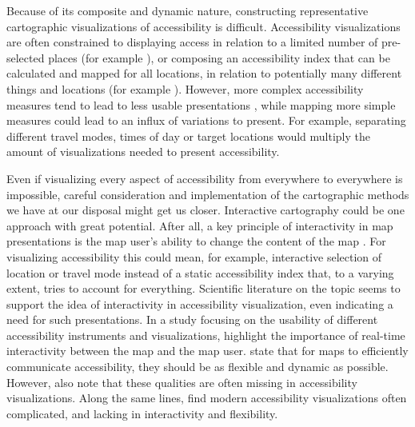 Because of its composite and dynamic nature,
constructing representative cartographic visualizations of accessibility is difficult.
Accessibility visualizations are often constrained
to displaying access in relation to
a limited number of pre-selected places (for example \textcite{wei2018}),
or composing an accessibility index
that can be calculated and mapped for all locations,
in relation to potentially many different things and locations
(for example \textcite{kim2019}).
However, more complex accessibility measures tend to lead to
less usable presentations \parencite{te2014},
while mapping more simple measures could lead to an influx of variations to present.
For example, separating different travel modes, times of day or target locations
would multiply the amount of visualizations needed to present accessibility.


Even if visualizing every aspect of accessibility
from everywhere to everywhere is impossible,
careful consideration and implementation
of the cartographic methods we have at our disposal might get us closer.
Interactive cartography could be one approach with great potential.
After all, a key principle of interactivity in map presentations is
the map user's ability to change the content of the map \parencite{rot2013b}.
For visualizing accessibility this could mean, for example,
interactive selection of location or travel mode instead of
a static accessibility index that, to a varying extent,
tries to account for everything.
Scientific literature on the topic seems to support the idea of
interactivity in accessibility visualization,
even indicating a need for such presentations.
In a study focusing on the usability of
different accessibility instruments and visualizations,  %
\textcite{te2014} highlight the importance of
real-time interactivity between the map and the map user.
\textcite{but2018} state that for maps to efficiently communicate accessibility,
they should be as flexible and dynamic as possible.
However, \textcite{but2018} also note that
these qualities are often missing in accessibility visualizations.
Along the same lines,
\textcite{paj2021} find modern accessibility visualizations often complicated,
and lacking in interactivity and flexibility.

